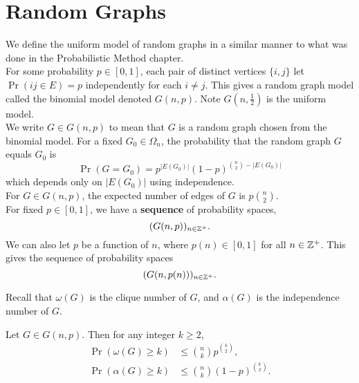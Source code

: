 \chapter{Random Graphs}

We define the uniform model of random graphs in a similar manner to what was done in the Probabilistic Method chapter. \\

For some probability \(p \in [0, 1]\), each pair of distinct vertices \(\{i, j \}\) let \(\Pr(ij \in E) = p\) independently for each \(i \neq j\). This gives a random graph model called the binomial model denoted \(G(n, p)\). Note \(G(n, \frac{1}{2})\) is the uniform model. \\

We write \(G \in G(n, p)\) to mean that \(G\) is a random graph chosen from the binomial model. For a fixed \(G_0 \in \Omega_n\), the probability that the random graph \(G\) equals \(G_0\) is
\[\Pr(G = G_0) = p^{|E(G_0)|} (1 - p)^{\binom{n}{2} - |E(G_0)|}\]
which depends only on \(|E(G_0)|\) using independence. \\

For \(G \in G(n, p)\), the expected number of edges of \(G\) is \(p\binom{n}{2}\). \\

For fixed \(p \in [0, 1]\), we have a \textbf{sequence} of probability spaces,
\[(G(n, p))_{n \in \mathbb{Z}^+}.\]
We can also let \(p\) be a function of \(n\), where \(p(n) \in [0, 1]\) for all \(n \in \mathbb{Z}^+\). This gives the sequence of probability spaces
\[(G(n, p(n)))_{n \in \mathbb{Z}^+}.\]

Recall that \(\omega(G)\) is the clique number of \(G\), and \(\alpha(G)\) is the independence number of \(G\).

\begin{lemma} \label{lemma-8.0.1}
    Let \(G \in G(n, p)\). Then for any integer \(k \geq 2\),
    \begin{align*}
        \Pr(\omega(G) \geq k) & \leq \binom{n}{k} p^{\binom{k}{2}}, \\
        \Pr(\alpha(G) \geq k) & \leq \binom{n}{k} (1 - p)^{\binom{k}{2}}.
    \end{align*}
\end{lemma}


